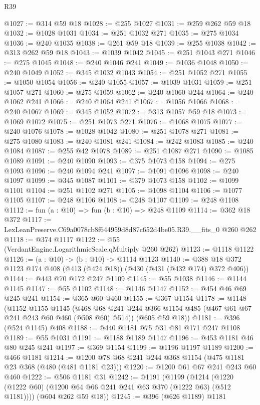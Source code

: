 \begin{lexlean}{R39}
\begin{coremodule}
@1027 := @314 @59 @18
@1028 := @255 @1027
@1031 := @259 @262 @59 @18
@1032 := @1028 @1031
@1034 := @251 @1032 @271
@1035 := @275 @1034
@1036 := @240 @1035
@1038 := @261 @59 @18
@1039 := @255 @1038
@1042 := @313 @262 @59 @18
@1043 := @1039 @1042
@1045 := @251 @1043 @271
@1046 := @275 @1045
@1048 := @240 @1046 @241
@1049 := @1036 @1048
@1050 := @240 @1049
@1052 := @345 @1032 @1043
@1054 := @251 @1052 @271
@1055 := @1050 @1054
@1056 := @240 @1055
@1057 := @1039 @1031
@1059 := @251 @1057 @271
@1060 := @275 @1059
@1062 := @240 @1060 @244
@1064 := @240 @1062 @241
@1066 := @240 @1064 @241
@1067 := @1056 @1066
@1068 := @240 @1067
@1069 := @345 @1052
@1072 := @313 @1057 @59 @18
@1073 := @1069 @1072
@1075 := @251 @1073 @271
@1076 := @1068 @1075
@1077 := @240 @1076
@1078 := @1028 @1042
@1080 := @251 @1078 @271
@1081 := @275 @1080
@1083 := @240 @1081 @241
@1084 := @242 @1083
@1085 := @240 @1084
@1087 := @255 @42 @1078
@1089 := @251 @1087 @271
@1090 := @1085 @1089
@1091 := @240 @1090
@1093 := @375 @1073 @158
@1094 := @275 @1093
@1096 := @240 @1094 @241
@1097 := @1091 @1096
@1098 := @240 @1097
@1099 := @345 @1087
@1101 := @379 @1073 @158
@1102 := @1099 @1101
@1104 := @251 @1102 @271
@1105 := @1098 @1104
@1106 := @1077 @1105
@1107 := @248 @1106
@1108 := @248 @1107
@1109 := @248 @1108
@1112 := fun (a : @10) => fun (b : @10) => @248 @1109
@1114 := @362 @18 @372
@1117 := LexLeanPreserve.C69a0078cb8f644959d8d87c652d4be05.R39.__fits_0 @260 @262
@1118 := @374 @1117
@1122 := @55 (VerdantEngine.LogarithmicScale.qMultiply @260 @262)
@1123 := @1118 @1122
@1126 := (a : @10) -> (b : @10) -> @1114 @1123
@1140 := @388 @18 @372 @1123 @174 @408 (@413 (@424 @18)) (@430 (@431 (@432 @174) @372 @406))
@1144 := @443 @70 @172 @247 @1109
@1145 := @55 @1038
@1146 := @1144 @1145
@1147 := @55 @1102
@1148 := @1146 @1147
@1152 := @454 @46 @69 @245 @241
@1154 := @365 @60 @460
@1155 := @367 @1154
@1178 := @1148
    (@1152
      @1155
      @1145
      (@468 @68 @241 @244 @366 @1154 @485 (@467 @61 @67 @241 @243 @60 @460 (@508 @60) @514))
      (@605 @59 @18))
@1181 := @396 (@524 @1145) @408
@1188 := @440 @1181 @75 @31 @81 @171 @247 @1108
@1189 := @55 @1031
@1191 := @1188 @1189 @1147
@1196 := @453 @1181 @46 @80 @245 @241
@1197 := @369 @1154
@1199 := @1196 @1197 @1189
@1200 := @466 @1181
@1214 := @1200 @78 @68 @241 @244 @368 @1154 (@475 @1181 @23 @368 (@480 (@481 @1181 @23)))
@1220 := @1200 @61 @67 @241 @243 @60 @460
@1222 := @506 @1181 @31
@1242 := @1191
    (@1199
      (@1214 (@1220 (@1222 @60) (@1200 @64 @66 @241 @241 @63 @370 (@1222 @63) (@512 @1181))))
      (@604 @262 @59 @18))
@1245 := @396 (@626 @1189) @1181

\end{coremodule}
\end{lexlean}
